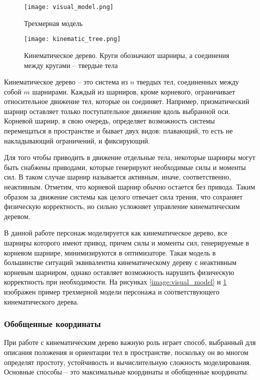 \begin{figure}
  \begin{minipage}[t]{0.475\textwidth}
    \centering
    \texttt{[image: visual\_model.png]}
    \caption{Трехмерная модель}
    \label{image:visual_model}
  \end{minipage}
\hfill
  \begin{minipage}[t]{0.475\textwidth}
    \centering
    \texttt{[image: kinematic\_tree.png]}
    \caption{Кинематическое дерево. Круги обозначают шарниры, а соединения между кругами -- твердые тела}
    \label{image:kinematic_tree}
  \end{minipage}
\end{figure}

Кинематическое дерево -- это система из $n$ твердых тел, соединенных между собой $m$ шарнирами. Каждый из шарниров, кроме корневого, ограничивает относительное движение тел, которые он соединяет. Например, призматический шарнир оставляет только поступательное движение вдоль выбранной оси. Корневой шарнир, в свою очередь, определяет возможность системы перемещаться в пространстве и бывает двух видов: плавающий, то есть не накладывающий ограничений, и фиксирующий.

Для того чтобы приводить в движение отдельные тела, некоторые шарниры могут быть снабжены приводами, которые генерируют необходимые силы и моменты сил. В таком случае шарнир называется активным, иначе, соответственно, неактивным. Отметим, что корневой шарнир обычно остается без привода. Таким образом за движение системы как целого отвечает сила трения, что сохраняет физическую корректность, но сильно усложняет управление кинематическим деревом.

В данной работе персонаж моделируется как кинематическое дерево, все шарниры которого имеют привод, причем силы и моменты сил, генерируемые в корневом шарнире, минимизируются в оптимизаторе. Такая модель в большинстве ситуаций эквивалентна кинематическому дереву с неактивным корневым шарниром, однако оставляет возможность нарушить физическую корректность при необходимости. На рисунках \ref{image:visual_model} и \ref{image:kinematic_tree} изображен пример трехмерной модели персонажа и соответствующего кинематического дерева.

\subsubsection{Обобщенные координаты}

При работе с кинематическим дерево важную роль играет способ, выбранный для описания положения и ориентации тел в пространстве, поскольку он во многом определят простоту, устойчивость и вычислительную сложность моделирования. Основные способы -- это максимальные координаты и обобщенные координаты.

